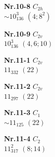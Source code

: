 \documentclass[12pt]{article}
\begin{document}
{\begin{minipage}[t]{3.5cm}
\end{minipage}
\setlength{\unitlength}{1cm}
\begin{minipage}[t]{3.5cm}
\centering
\epsfxsize=2.5cm
\par
{{\bf Nr.10-8} \quad $C_{2h}$\\ $\sim 10^3_{136}$ \quad $(4;8^2)$\\\vspace{3mm} }
\end{minipage}
\setlength{\unitlength}{1cm}
\begin{minipage}[t]{3.5cm}
\centering
\epsfxsize=2.5cm
\par
{{\bf Nr.10-9} \quad $C_{2v}$\\ $10^3_{136}$ \quad $(4,6;10)$\\\vspace{3mm} }
\end{minipage}
\setlength{\unitlength}{1cm}
\begin{minipage}[t]{3.5cm}
\centering
\epsfxsize=2.5cm
\par
{{\bf Nr.11-1} \quad $C_{2v}$\\ $11_{332}$ \quad $(22)$\\\vspace{3mm} }
\end{minipage}
\setlength{\unitlength}{1cm}
\begin{minipage}[t]{3.5cm}
\centering
\epsfxsize=2.5cm
\par
{{\bf Nr.11-2} \quad $C_{2v}$\\ $11_{297}$ \quad $(22)$\\\vspace{3mm} }
\end{minipage}
\setlength{\unitlength}{1cm}
\begin{minipage}[t]{3.5cm}
\centering
\epsfxsize=2.5cm
\par
{{\bf Nr.11-3} \quad $C_{1}$\\ $\sim 11_{125}$ \quad $(22)$\\\vspace{3mm} }
\end{minipage}
\setlength{\unitlength}{1cm}
\begin{minipage}[t]{3.5cm}
\centering
\epsfxsize=2.5cm
\par
{{\bf Nr.11-4} \quad $C_{2}$\\ $11^2_{317}$ \quad $(8;14)$\\\vspace{3mm} }

\end{minipage}}
\end{document}
